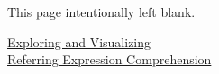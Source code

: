 




\cleardoublepage{}
\thispagestyle{empty}
\null\vfill
\begin{center}
  \vspace{-2ex}
  This page intentionally left blank.
\end{center}
\vfill\null{}


\cleardoublepage{}
\setcounter{page}{1} %
\thispagestyle{empty}


\begin{center}
  \LARGE
  \null{}
  \href{https://recomprehension.com}{{Exploring and Visualizing\\
      Referring Expression Comprehension}}\\[-.5ex]
\end{center}


